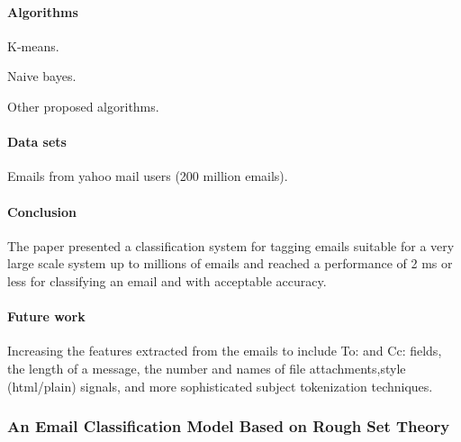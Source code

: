 \documentclass[12pt]{article}
\newenvironment{my_itemize}
{\begin{itemize}
  \setlength{\itemsep}{0cm}
  \setlength{\parskip}{0cm}}
{\end{itemize}}
\begin{document}
\paragraph{Algorithms}
\begin{my_itemize}
  \item K-means.
  \item Naive bayes.
  \item Other proposed algorithms.
\end{my_itemize}

\paragraph{Data sets}
\begin{my_itemize}
  \item Emails from yahoo mail users (200 million emails).
\end{my_itemize}


\paragraph{Conclusion}
\begin{my_itemize}
  \item The paper presented a classification system for tagging emails suitable for a very 
	large scale system up to millions of emails and reached a performance of 2 ms or 
	less for classifying an email and with acceptable accuracy.
\end{my_itemize}

\paragraph{Future work}
\begin{my_itemize}
  \item Increasing the features extracted from the emails to include To: and Cc: fields,
	the length of a message, the number and names of file attachments,style (html/plain) signals, 
	and more sophisticated subject tokenization techniques.
\end{my_itemize}



\subsubsection{An Email Classification Model Based on Rough Set Theory \cite{WENQING05}}
\end{document}
